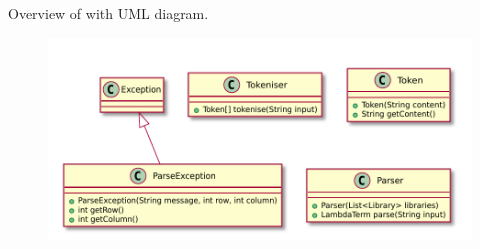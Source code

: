 Overview of \texttt{\pkg} with UML diagram.

\begin{figure}[H]
	\centering
	\includegraphics[width=\textwidth]{packageDiagrams/parsingPackage}
\end{figure}
